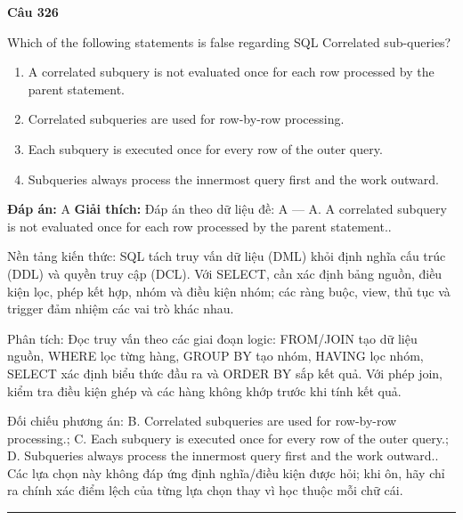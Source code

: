\documentclass[11pt,a4paper]{article}
\newenvironment{question}[1]{%
  \par\vspace{1em}\noindent\textbf{\large Câu #1}\par\vspace{0.4em}
}{%
  \par\vspace{1em}\hrule\vspace{0.6em}
}
\newenvironment{choices}{%
  \begin{enumerate}[label=\textbf{\Alph*.},leftmargin=2.2em,itemsep=2pt,topsep=3pt]
}{%
  \end{enumerate}
}
\newcommand{\choice}{\item}
\begin{document}
\begin{question}{326}
Which of the following statements is false regarding SQL Correlated sub-queries?
\begin{choices}
\choice A correlated subquery is not evaluated once for each row processed by the parent statement.
\choice Correlated subqueries are used for row-by-row processing.
\choice Each subquery is executed once for every row of the outer query.
\choice Subqueries always process the innermost query first and the work outward.
\end{choices}
\textbf{Đáp án:} A
\textbf{Giải thích:} Đáp án theo dữ liệu đề: A — A. A correlated subquery is not evaluated once for each row processed by the parent statement..

Nền tảng kiến thức: SQL tách truy vấn dữ liệu (DML) khỏi định nghĩa cấu trúc (DDL) và quyền truy cập (DCL). Với SELECT, cần xác định bảng nguồn, điều kiện lọc, phép kết hợp, nhóm và điều kiện nhóm; các ràng buộc, view, thủ tục và trigger đảm nhiệm các vai trò khác nhau.

Phân tích: Đọc truy vấn theo các giai đoạn logic: FROM/JOIN tạo dữ liệu nguồn, WHERE lọc từng hàng, GROUP BY tạo nhóm, HAVING lọc nhóm, SELECT xác định biểu thức đầu ra và ORDER BY sắp kết quả. Với phép join, kiểm tra điều kiện ghép và các hàng không khớp trước khi tính kết quả.

Đối chiếu phương án: B. Correlated subqueries are used for row-by-row processing.; C. Each subquery is executed once for every row of the outer query.; D. Subqueries always process the innermost query first and the work outward.. Các lựa chọn này không đáp ứng định nghĩa/điều kiện được hỏi; khi ôn, hãy chỉ ra chính xác điểm lệch của từng lựa chọn thay vì học thuộc mỗi chữ cái.
\end{question}
\end{document}
